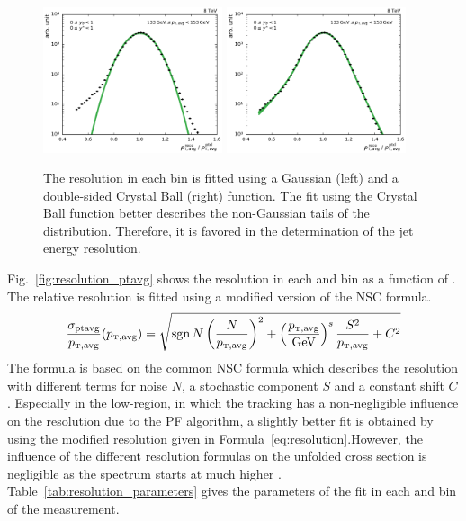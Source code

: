 \begin{figure}[h!tbp]
    \centering
    \includegraphics[width=0.47\textwidth]{figures/measurement/resolution_yb0ys0_bin10.pdf}\hfill
    \includegraphics[width=0.47\textwidth]{figures/measurement/resolution_yb0ys0_bin10_cb.pdf}
    \caption[Gaussian and Crystal Ball fit of resolution.]{The resolution in
        each \ptavg bin is fitted using a Gaussian (left) and a double-sided Crystal Ball
        (right) function. The fit using the Crystal Ball function better describes the
        non-Gaussian tails of the distribution. Therefore, it is favored in the
    determination of the jet energy resolution.}
    \label{fig:resolution_bin}
\end{figure}

Fig.~\ref{fig:resolution_ptavg} shows the resolution in each \ystar and
\yboost bin as a function of \ptavg. The relative resolution is fitted using a
modified version of the NSC formula.
%
\begin{equation}
    \frac{\sigma_{\text{ptavg}}}{\ptavg} (\ptavg) = \sqrt{\sgn{N} \left(\frac{N}{\ptavg}\right)^2 + \left(\frac{\ptavg}{\text{GeV}}\right)^s \frac{S^2}{\ptavg} + C^2 }
    \label{eq:resolution}
\end{equation}
%
The formula is based on the common NSC formula which describes the resolution
with different terms for noise $N$, a stochastic component $S$ and a constant
shift $C$. Especially in the low-\pt region, in which the tracking has a
non-negligible influence on the resolution due to the PF algorithm, a
slightly better fit is obtained by using the modified resolution given in
Formula~\ref{eq:resolution}.However, the influence of the different resolution formulas
on the unfolded cross section is negligible as the spectrum starts at
much higher \ptavg. Table~\ref{tab:resolution_parameters} gives the parameters of
the fit in each \ystar and \yboost bin of the measurement.


